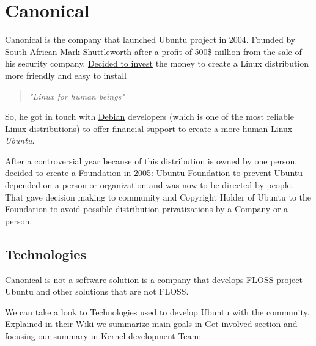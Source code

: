 \section{Canonical}
\label{sec:canonical}

\par Canonical is the company that launched Ubuntu project in 2004. Founded by South African \href{http://www.markshuttleworth.com/}{Mark Shuttleworth} after a profit of 500\$ million from the sale of his  security company. \href{http://www.markshuttleworth.com/archives/4}{Decided to invest} the money to create a Linux distribution more friendly and easy to install

\begin{quote}
    \textit{"Linux for human beings"}
\end{quote}

\par So, he got in touch with \href{http://www.debian.org/index.html}{Debian} developers (which is one of the most reliable Linux distributions) to offer financial support to create a more human Linux \textit{Ubuntu}.

\par After a  controversial year because of this distribution is owned by one person, decided to create a Foundation in 2005: Ubuntu Foundation to prevent Ubuntu depended on a person or organization and was now to be directed by people. That gave decision making to community and Copyright Holder of Ubuntu to the Foundation to avoid possible distribution privatizations by a Company or a person.

\subsection{Technologies}

\par Canonical is not a software solution is a company that develops FLOSS project Ubuntu and other solutions that are not FLOSS.

\par We can take a look to Technologies used to develop Ubuntu with the community. Explained in their \href{https://wiki.ubuntu.com/}{Wiki} we summarize main goals in Get involved section and focusing our summary in Kernel development Team:

